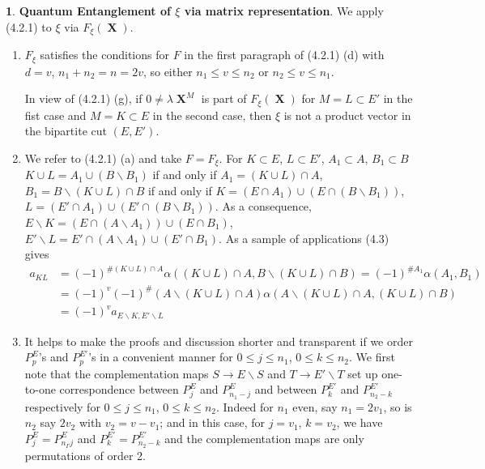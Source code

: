 \documentclass[a4paper,12pt]{article}
\DeclareMathOperator{\x}{\mathrm{X}}
\theoremstyle{definition}
\theoremstyle{underlinethm}
\theoremstyle{definition}
\newtheorem{subsubsec}{}[subsection]
\begin{document}
\begin{subsubsec}\label{subsubsection-4.2.2}
\textbf{Quantum Entanglement of $\xi$ via matrix representation}. We apply (4.2.1) to $\xi$ via $F_{\xi}(\boldsymbol{\x})$.
\begin{enumerate}[label=(\alph*)]
\item $F_{\xi}$ satisfies the conditions for $F$ in the first paragraph of (4.2.1) (d) with $d=v$, $n_{1} + n_{2} =n = 2v$, so either $n_{1}\leq v \leq n_{2}$ or $n_{2} \leq v \leq n_{1}$.

In view of (4.2.1) (g), if $0 \neq \lambda \boldsymbol{\x}^{M}$ is part of $F_{\xi}(\boldsymbol{\x})$ for $M=L \subset E'$ in the fist case and $M = K \subset E$ in the second case, then $\xi$ is not a product vector in the bipartite cut $(E, E')$.

\item We refer to (4.2.1) (a) and take $F= F_{\xi}$. For $K\subset E$, $L \subset E'$, $A_{1} \subset A$, $B_{1} \subset B$ $K \cup L = A_{1} \cup (B \smallsetminus B_{1})$ if and only if $A_{1} = (K \cup L) \cap A$, $B_{1}= B \smallsetminus (K \cup L)\cap B$ if and only if $K =(E \cap A_{1}) \cup (E \cap (B\smallsetminus B_{1}))$, $L=(E' \cap A_{1})\cup (E' \cap (B \smallsetminus B_{1}))$. As a consequence, $E \smallsetminus K = (E \cap (A \smallsetminus A_{1})) \cup (E \cap B_{1})$, $E' \smallsetminus L = E' \cap (A \smallsetminus A_{1}) \cup (E' \cap B_{1})$. As a sample of applications (4.3) gives
\begin{align*}
a_{K L} &= (-1)^{\#(K \cup L)\cap A} \alpha \left((K \cup L) \cap A, B \smallsetminus (K \cup L) \cap B \right) = (-1)^{\# A_{1}} \alpha(A _{1}, B_{1})\\
 & = (-1)^{v} (-1)^{\#} (A \smallsetminus (K \cup L) \cap A) \alpha (A \smallsetminus (K \cup L) \cap A, (K \cup L )\cap B)\\
 & = (-1)^{v} a_{E \smallsetminus K, E' \smallsetminus L} \tag{4.21}\label{eq-4.21}
\end{align*}

\item It helps to make the proofs and discussion shorter and transparent if we order $P_{p}^{E}$'s and $P_{p}^{E'}$'s in a convenient manner for $0 \leq j \leq n_{1}$, $0 \leq k \leq n_{2}$. We first note that the complementation maps $S \rightarrow E \smallsetminus S$ and $T \rightarrow E' \smallsetminus T$ set up one-to-one correspondence between $P_{j}^{E}$ and $P_{n_{1}-j}^{E}$ and between $P_{k}^{E'}$ and $P_{n_{2}-k}^{E'}$ respectively for $0 \leq j \leq n_{1}$, $0 \leq k \leq n_{2}$. Indeed for $n_{1}$ even, say $n_{1}= 2v_{1}$, so is $n_{2}$ say $2v_{2}$ with $v_{2}= v-v_{1}$; and in this case, for $j=v_{1}$, $k=v_{2}$, we have $P_{j}^{E}= P_{n_{\Gamma}j}^{E}$ and $P_{k}^{E'} = P_{n_{2}-k}^{E'}$ and the complementation maps are only permutations of order 2.


\end{enumerate}
\end{subsubsec}
\end{document}
